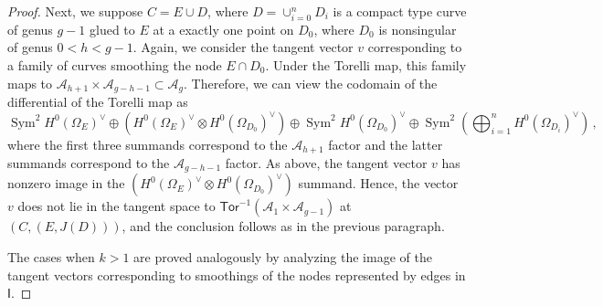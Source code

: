 \documentclass[10pt,a4paper]{amsart}
\DeclareMathOperator{\Sym}{Sym}
\newcommand{\A}{\mathcal{A}}
\newcommand{\Tor}{\mathsf{Tor}}
\begin{document}
\begin{proof}
    Next, we suppose $C=E\cup D$, where $D=\cup_{i=0}^{n} D_i$ is a compact type curve of genus $g-1$ glued to $E$ at a exactly one point on $D_0$, where $D_0$ is nonsingular of genus $0<h<g-1$. Again, we consider the tangent vector $v$ corresponding to a family of curves smoothing the node $E\cap D_0$. Under the Torelli map, this family maps to $\A_{h+1}\times \A_{g-h-1}\subset \A_g$. %
    Therefore, we can view the codomain of the differential of the Torelli map as 
    \[
    \Sym^2 H^0(\Omega_E)^{\vee}\oplus (H^0(\Omega_E)^{\vee}\otimes H^0(\Omega_{D_0})^{\vee}) \oplus \Sym^2 H^0(\Omega_{D_0})^{\vee}\oplus \Sym^2 \left(\bigoplus_{i=1}^{n} H^0(\Omega_{D_i})^{\vee}\right)\,,
    \]
    where the first three summands correspond to the $\A_{h+1}$ factor and the latter summands correspond to the $\A_{g-h-1}$ factor.
    As above, the tangent vector $v$ has nonzero image in the $(H^0(\Omega_E)^{\vee}\otimes H^0(\Omega_{D_0})^{\vee})$ summand. %
    Hence, the vector $v$ does not lie in the tangent space to $\Tor^{-1}(\A_1\times \A_{g-1})$ at $(C, (E,J(D)))$, and the conclusion follows as in the previous paragraph. 

    The cases when $k>1$ are proved analogously by analyzing the image of the tangent vectors corresponding to smoothings of the nodes represented by edges in $\mathsf{I}$.
     \end{proof}
\end{document}
